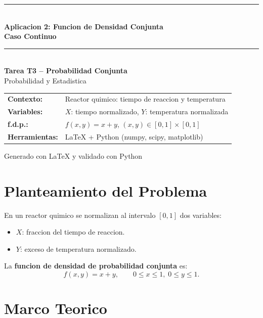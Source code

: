 \documentclass[12pt,a4paper]{article}
\begin{document}
\begin{titlepage}
  \centering
  \vspace*{2cm}
  {\color{azuluni}\rule{\linewidth}{1.5pt}}\\[0.5cm]
  {\LARGE\bfseries\color{azuluni}
   Aplicacion 2: Funcion de Densidad Conjunta\\[0.3cm]
   Caso Continuo}\\[0.3cm]
  {\color{azuluni}\rule{\linewidth}{1.5pt}}\\[1.5cm]
  {\large\bfseries Tarea T3 -- Probabilidad Conjunta}\\[0.4cm]
  {\large Probabilidad y Estadistica}\\[2cm]
  \begin{tabular}{ll}
    \textbf{Contexto:}     & Reactor quimico: tiempo de reaccion y temperatura \\[0.2cm]
    \textbf{Variables:}    & $X$: tiempo normalizado, $Y$: temperatura normalizada \\[0.2cm]
    \textbf{f.d.p.:}       & $f(x,y) = x + y$, \quad $(x,y)\in[0,1]\times[0,1]$ \\[0.2cm]
    \textbf{Herramientas:} & \LaTeX{} + Python (numpy, scipy, matplotlib) \\
  \end{tabular}
  \vfill
  {\small\color{gray} Generado con \LaTeX{} y validado con Python}
\end{titlepage}

\section{Planteamiento del Problema}

En un reactor quimico se normalizan al intervalo $[0,1]$ dos variables:
\begin{itemize}
  \item $X$: fraccion del tiempo de reaccion.
  \item $Y$: exceso de temperatura normalizado.
\end{itemize}

La \textbf{funcion de densidad de probabilidad conjunta} es:
\[
  \boxed{f(x,y) = x + y, \qquad 0 \leq x \leq 1,\; 0 \leq y \leq 1.}
\]

\section{Marco Teorico}
\end{document}
